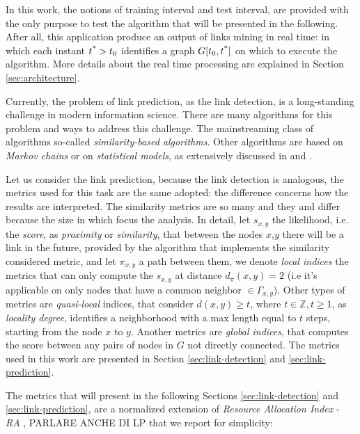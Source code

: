 In this work, the notions of training interval and test interval, are provided with the only purpose to test the algorithm that will be presented in the following. After all, this application produce an output of links mining in real time: in which each instant $t\textsuperscript{*}>t_{0}$ identifies a graph $G[t_{0},t\textsuperscript{*}]$ on which to execute the algorithm. More details about the real time processing are explained in Section \ref{sec:architecture}.

Currently, the problem of link prediction, as the link detection, is a long-standing challenge in modern information science. There are many algorithms for this problem and ways to address this challenge. The mainstreaming class of algorithms so-called \textit{similarity-based algorithms}. Other algorithms are based on \textit{Markov chains} or on \textit{statistical models}, as extensively discussed in \cite{Liben-Nowell} and \cite{Lu2011}.

Let us consider the link prediction, because the link detection is analogous, the metrics used for this task are the same adopted: the difference concerns how the results are interpreted. The similarity metrics are so many and they and differ because the size in which focus the analysis. In detail, let $s_{x,y}$ the likelihood, i.e. the \textit{score}, as \textit{proximity} or \textit{similarity}, that between the nodes $x$,$y$ there will be a link in the future, provided by the algorithm that implements the similarity considered metric, and let $\pi_{x,y}$ a path between them, we denote \textit{local indices} the metrics that can only compute the $s_{x,y}$ at distance $d_{\pi}(x,y) = 2$ (i.e it's applicable on only nodes that have a common neighbor $\in \Gamma_{x,y}$). Other types of metrics are \textit{quasi-local} indices, that consider $d(x,y) \geq t$, where $t\in \mathbb{Z}, t\geq 1 $, as \textit{locality degree}, identifies a neighborhood with a max length equal to $t$ steps, starting from the node $x$ to $y$. Another metrics are \textit{global indices}, that computes the score between any pairs of nodes in $G$ not directly connected\cite{Lu2011}. The metrics used in this work are presented in Section \ref{sec:link-detection} and \ref{sec:link-prediction}.

The metrics that will present in the following Sections \ref{sec:link-detection} and \ref{sec:link-prediction}, are a normalized extension of \textit{Resource Allocation Index} - \textit{RA} \cite{zhou2009predicting}, PARLARE ANCHE DI LP that we report for simplicity:

